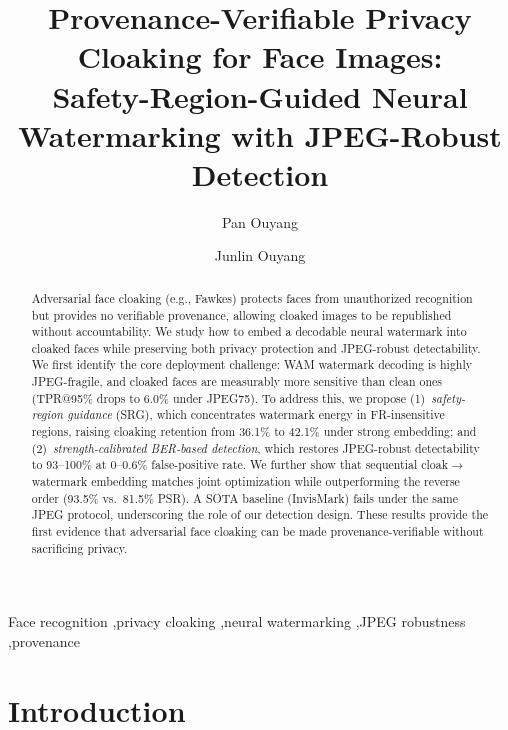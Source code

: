 \documentclass[preprint,12pt]{elsarticle}
\begin{document}
\begin{frontmatter}

\title{Provenance-Verifiable Privacy Cloaking for Face Images:\\ Safety-Region-Guided Neural Watermarking with JPEG-Robust Detection}

\author[aff1]{Pan Ouyang}
\author[aff1]{Junlin Ouyang}

\begin{abstract}
Adversarial face cloaking (e.g., Fawkes) protects faces from unauthorized recognition but provides no verifiable provenance, allowing cloaked images to be republished without accountability. We study how to embed a decodable neural watermark into cloaked faces while preserving both privacy protection and JPEG-robust detectability. We first identify the core deployment challenge: WAM watermark decoding is highly JPEG-fragile, and cloaked faces are measurably more sensitive than clean ones (TPR@95\% drops to 6.0\% under JPEG75). To address this, we propose (1)~\emph{safety-region guidance} (SRG), which concentrates watermark energy in FR-insensitive regions, raising cloaking retention from 36.1\% to 42.1\% under strong embedding; and (2)~\emph{strength-calibrated BER-based detection}, which restores JPEG-robust detectability to 93--100\% at 0--0.6\% false-positive rate. We further show that sequential cloak$\rightarrow$watermark embedding matches joint optimization while outperforming the reverse order (93.5\% vs.\ 81.5\% PSR). A SOTA baseline (InvisMark) fails under the same JPEG protocol, underscoring the role of our detection design. These results provide the first evidence that adversarial face cloaking can be made provenance-verifiable without sacrificing privacy.
\end{abstract}

\begin{keyword}
Face recognition \sep privacy cloaking \sep neural watermarking \sep JPEG robustness \sep provenance
\end{keyword}

\end{frontmatter}

\section{Introduction}
\label{sec:intro}
\end{document}
